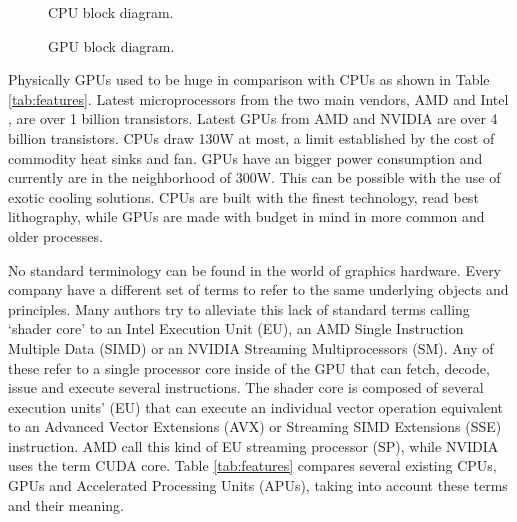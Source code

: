 \documentclass{comjnl}
\begin{document}
\begin{figure}[h]
\centering
{}
\caption{CPU block diagram.}
\label{fig:cpu}
\end{figure}

\begin{figure}[h]
\centering
{}
\caption{GPU block diagram.}
\label{fig:gpu}
\end{figure}

Physically GPUs used to be huge in comparison with CPUs as shown in
Table \ref{tab:features}. Latest microprocessors from the two main
vendors, AMD \cite{amd} and Intel \cite{intel}, are over 1 billion
transistors. Latest GPUs from AMD and NVIDIA \cite{nvidia} are over 4
billion transistors. CPUs draw 130W at most, a limit established by
the cost of commodity heat sinks and fan. GPUs have an bigger power
consumption and currently are in the neighborhood of 300W. This can be
possible with the use of exotic cooling solutions. CPUs are built with
the finest technology, read best lithography, while GPUs are made with
budget in mind in more common and older processes. %

No standard terminology can be found in the world of graphics hardware.
Every company have a  different set of terms to refer to the same
underlying objects and principles. Many authors try to alleviate this
lack of standard terms calling `shader core' to an Intel Execution
Unit (EU), an AMD Single Instruction Multiple Data (SIMD) or an NVIDIA
Streaming Multiprocessors (SM). Any of these refer to a single
processor core inside of the GPU that can fetch, decode, issue and
execute several instructions. The shader core is composed of several
execution units' (EU) that can execute an individual vector operation
equivalent to an Advanced Vector Extensions (AVX) or Streaming SIMD
Extensions (SSE) instruction. AMD call this kind of EU streaming
processor (SP), while NVIDIA uses the term CUDA core. Table
\ref{tab:features} compares several existing CPUs, GPUs and
Accelerated Processing Units (APUs), taking into account these terms
and their meaning. %
\end{document}
